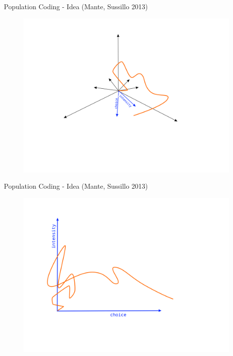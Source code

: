 \documentclass[10pt]{beamer}
\begin{document}
\begin{frame}[fragile]{Population Coding - Idea (Mante, Sussillo 2013)}
\begin{center}
	\begin{figure}
      \includegraphics[width=1.0\textwidth]{new_coord.png}
	\end{figure}
	\end{center}
\end{frame}


\begin{frame}[fragile]{Population Coding - Idea (Mante, Sussillo 2013)}
\begin{center}
	\begin{figure}
      \includegraphics[width=1.0\textwidth]{trafo_final.png}
	\end{figure}
	\end{center}
\end{frame}
\end{document}
